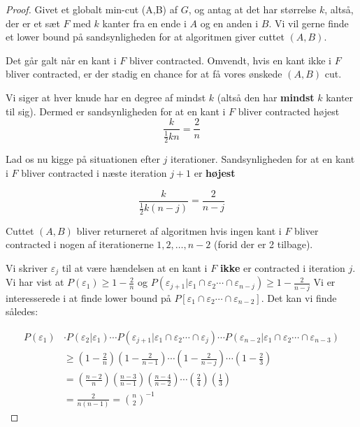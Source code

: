 \documentclass[11pt]{article}
\theoremstyle{definition}
\theoremstyle{remark}
\begin{document}
\begin{proof}
Givet et globalt min-cut (A,B) af $G$, og antag at det har størrelse $k$, altså, der er et sæt $F$ med $k$ kanter fra en ende i $A$ og en anden i $B$. Vi vil gerne finde et lower bound på sandsynligheden for at algoritmen giver cuttet $(A,B)$.

Det går galt når en kant i $F$ bliver contracted. Omvendt, hvis en kant ikke i $F$ bliver contracted, er der stadig en chance for at få vores ønskede $(A,B)$ cut.

Vi siger at hver knude har en degree af mindst $k$ (altså den har \textbf{mindst} $k$ kanter til sig). Dermed er sandsynligheden for at en kant i $F$ bliver contracted højest
\[ \frac{k}{\frac{1}{2}kn} = \frac{2}{n} \]

Lad os nu kigge på situationen efter $j$ iterationer. Sandsynligheden for at en kant i $F$ bliver contracted i næste iteration $j+1$ er \textbf{højest}

\[ \frac{k}{\frac{1}{2}k(n-j)} = \frac{2}{n-j} \]

Cuttet $(A,B)$ bliver returneret af algoritmen hvis ingen kant i $F$ bliver contracted i nogen af iterationerne $1, 2, \ldots, n-2$ (forid der er 2 tilbage).

Vi skriver $\varepsilon_{j}$ til at være hændelsen at en kant i $F$ \textbf{ikke} er contracted i iteration $j$. Vi har vist at $P(\varepsilon_{1}) \geq 1 - \frac{2}{n}$ og $P(\varepsilon_{j+1}|\varepsilon_{1} \cap \varepsilon_{2} \cdots \cap \varepsilon_{n-j}) \geq 1 - \frac{2}{n-j}$
Vi er interesserede i at finde lower bound på $P[\varepsilon_{1} \cap \varepsilon_{2} \cdots \cap \varepsilon_{n-2}]$. Det kan vi finde således:

\begin{equation}
\begin{split}
  P(\varepsilon_{1}) &\cdot P(\varepsilon_{2}|\varepsilon_{1}) \cdots P(\varepsilon_{j+1}| \varepsilon_{1} \cap \varepsilon_{2} \cdots \cap \varepsilon_{j}) \cdots P(\varepsilon_{n-2}| \varepsilon_{1} \cap \varepsilon_{2} \cdots \cap \varepsilon_{n-3})\\
           &\geq \left( 1-\frac{2}{n} \right) \left( 1- \frac{2}{n-1} \right)\cdots \left( 1- \frac{2}{n-j} \right) \cdots \left( 1- \frac{2}{3}\right)\\
           &= \left( \frac{n-2}{n} \right) \left( \frac{n-3}{n-1} \right) \left( \frac{n-4}{n-2} \right) \cdots \left( \frac{2}{4} \right) \left( \frac{1}{3} \right)\\
  &= \frac{2}{n(n-1)} = \binom{n}{2}^{-1}
\end{split}
\end{equation}
\end{proof}
\end{document}
